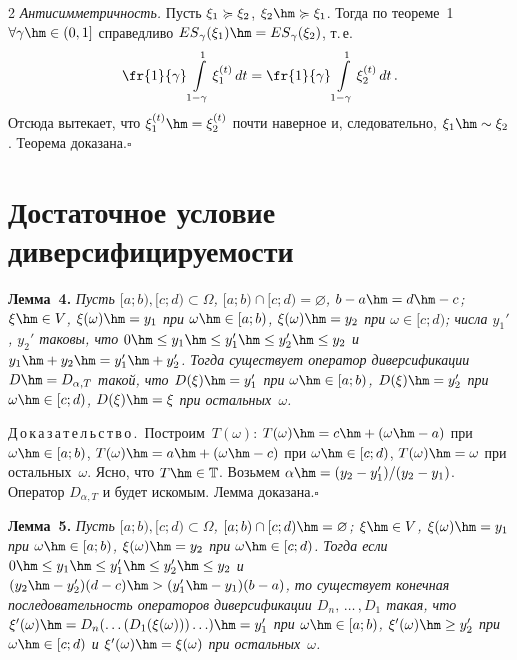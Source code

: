 \begin{multicols}{2}
\textit{Антисимметричность.} Пусть $\xi_1 \succcurlyeq \xi_2$, $\xi_2
\hm\divers \xi_1$. Тогда по теореме~1 $\forall \gamma \hm\in (0,1]$
справедливо ${ES}_\gamma(\xi_1)\hm = {ES}_\gamma(\xi_2)$, т.\,е.\
$$
\fr{1}{\gamma} \int\limits_{1-\gamma}^1 \xi_1^{(t)} \,dt = \fr{1}{\gamma}
\int\limits_{1-\gamma}^1 \xi_2^{(t)} \,dt\,.
$$ 
Отсюда вытекает, что
$\xi_1^{(t)} \hm= \xi_2^{(t)}$ почти наверное и, следовательно, $\xi_1
\hm\sim \xi_2$. Теорема доказана.\hfill$\square$


\section{Достаточное условие диверсифицируемости}

\noindent
\textbf{Лемма~4.} \textit{Пусть $[a;b),[c;d) \subset \Omega$,
$[a;b)\cap[c;d)=\varnothing$, $b-a\hm=d\hm-c$; $\xi\hm\in V$,
$\xi(\omega) \hm= y_1$  при $\omega \hm\in [a;b)$, $\xi(\omega)\hm =
y_2$ при $\omega \in [c;d)$; числа $y_1'$, $y_2'$ таковы, что
$0 \hm\le y_1 \hm\le y_1' \hm\le y_2' \hm\le y_2$ и $y_1\hm+y_2 \hm= y_1'\hm+
y_2'$. Тогда существует оператор диверсификации $D \hm= D_{\alpha,T}$
такой, что $D(\xi) \hm= y_1'$ при $\omega \hm\in [a;b)$, $D(\xi) \hm= y_2'$
при $\omega \hm\in [c;d)$,  $D(\xi) \hm= \xi$ при остальных~$\omega $.}

\medskip

\noindent
Д\,о\,к\,а\,з\,а\,т\,е\,л\,ь\,с\,т\,в\,о\,.\ 
Построим~$T(\omega)$:  $T(\omega) \hm= c \hm+ (\omega \hm- a)$ при $\omega
\hm\in [a;b)$, $T(\omega) \hm= a \hm+ (\omega \hm- c)$ при $\omega \hm\in [c;d)$,
$T(\omega) \hm= \omega$ при остальных~$\omega$. Ясно, что $T \hm\in
\classT$. Возьмем $\alpha \hm= (y_2-y_1')/(y_2-y_1)$. Оператор
$D_{\alpha,T}$ и будет искомым. Лемма доказана.\hfill$\square$

\medskip

\noindent
\textbf{Лемма~5.} \textit{Пусть $[a;b),[c;d) \subset \Omega$,
$[a;b)\cap[c;d)\hm=\varnothing$; $\xi\hm\in V$, $\xi(\omega) \hm= y_1$ при
$\omega\hm\in[a;b)$, $\xi(\omega)\hm = y_2$ при $\omega\hm\in[c;d)$. Тогда
если $ 0 \hm\le y_1 \hm\le y_1' \hm\le y_2' \hm\le y_2 $ и 
$(y_2 \hm- y_2')(d-c) \hm > (y_1' \hm- y_1)(b-a)$, 
то существует конечная последовательность
операторов диверсификации $D_n,\,\ldots\,,D_1$ такая, что
$\xi'(\omega) \hm= D_n(\ldots(D_1(\xi(\omega)))\ldots) \hm= y_1'$ при  
$\omega \hm\in [a;b)$, $\xi'(\omega) \hm\ge y_2'$  при 
$\omega \hm\in [c;d)$ и  $\xi'(\omega) \hm= \xi(\omega)$ при
остальных~$\omega$.} 

\medskip


\end{multicols}
